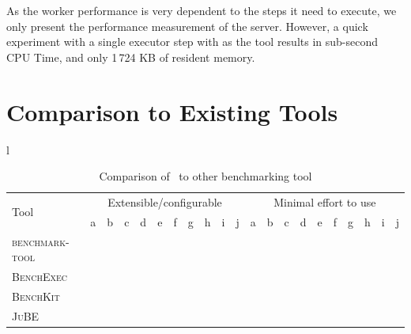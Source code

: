 As the worker performance is very dependent to the steps it need to execute, we only present the performance measurement of the server.
However, a quick experiment with a single executor step with  as the tool results in sub-second CPU Time, and only 1\,724 KB of resident memory.

\section{Comparison to Existing Tools}
\label{sec:eval.comparison}

\begin{table}
    \caption{Comparison of \OurBenchmarkingTool~to other benchmarking tool}
        \label{tab:eval.compare.req}
    \begin{threeparttable}
        \begin{adjustbox}{max width=\textwidth}
            \begin{tabular}{l}
                \begin{tabular}{l | cccccccccc | cccccccccc}
                    \toprule
                    \multirow{2}{*}{Tool} &
                        \multicolumn{10}{c|}{Extensible/configurable} &
                        \multicolumn{10}{c}{Minimal effort to use}\\
                        & a & b & c & d & e & f & g & h & i & j &
                        a & b & c & d & e & f & g & h & i & j\\
                    \midrule
                    \textsc{benchmark-tool} &
                        & \checkmark & \checkmark & \checkmark & \checkmark & \checkmark & \checkmark & & \checkmark & \checkmark &
                        \checkmark & \checkmark & & & & \checkmark & & & &\\
                    \textsc{BenchExec} &
                        & & & \checkmark & \checkmark & & \checkmark & & \checkmark & &
                        \checkmark & \checkmark & \checkmark & \checkmark & & & & & \checkmark & \checkmark\\
                    \textsc{BenchKit} &
                        & \checkmark & & & \checkmark & & \checkmark & & \checkmark & &
                        & \checkmark & \checkmark & & & & & & \checkmark &\\
                    \textsc{JuBE} &
                        \checkmark & \checkmark & & \checkmark & \checkmark & \checkmark & \checkmark & \checkmark & \checkmark & \checkmark &
                        \checkmark & \checkmark & \checkmark & \checkmark & \checkmark & \checkmark & \checkmark & \checkmark & &\\

\end{tabular}
\end{tabular}
\end{adjustbox}
\end{threeparttable}
\end{table}
